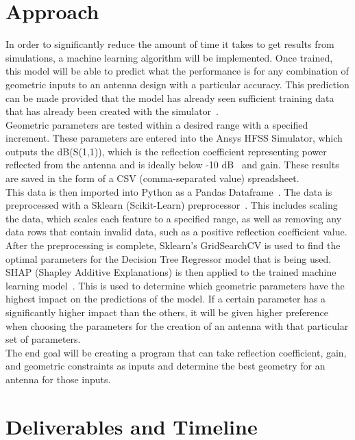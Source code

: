 \documentclass[12pt, letterpaper, notitlepage]{article}
\begin{document}
\section*{Approach}
In order to significantly reduce the amount of time it takes to get results from simulations, a machine learning algorithm will be implemented. Once trained, this model will be able to predict what the performance is for any combination of geometric inputs to an antenna design with a particular accuracy. This prediction can be made provided that the model has already seen sufficient training data that has already been created with the simulator~\cite{Naseri_2021}.\\
Geometric parameters are tested within a desired range with a specified increment. These parameters are entered into the Ansys HFSS Simulator, which outputs the dB(S(1,1)), which is the reflection coefficient representing power reflected from the antenna and is ideally below -10 dB~\cite{Bevelacqua_2015} and gain. These results are saved in the form of a CSV (comma-separated value) spreadsheet.\\
This data is then imported into Python as a Pandas Dataframe~\cite{reback2020pandas}. The data is preprocessed with a Sklearn (Scikit-Learn) preprocessor~\cite{scikit-learn}. This includes scaling the data, which scales each feature to a specified range, as well as removing any data rows that contain invalid data, such as a positive reflection coefficient value.\\
After the preprocessing is complete, Sklearn's GridSearchCV is used to find the optimal parameters for the Decision Tree Regressor model that is being used.\\
SHAP (Shapley Additive Explanations) is then applied to the trained machine learning model~\cite{lundberg2017unified}. This is used to determine which geometric parameters have the highest impact on the predictions of the model. If a certain parameter has a significantly higher impact than the others, it will be given higher preference when choosing the parameters for the creation of an antenna with that particular set of parameters.\\
The end goal will be creating a program that can take reflection coefficient, gain, and geometric constraints as inputs and determine the best geometry for an antenna for those inputs. 

\section*{Deliverables and Timeline}
\end{document}
